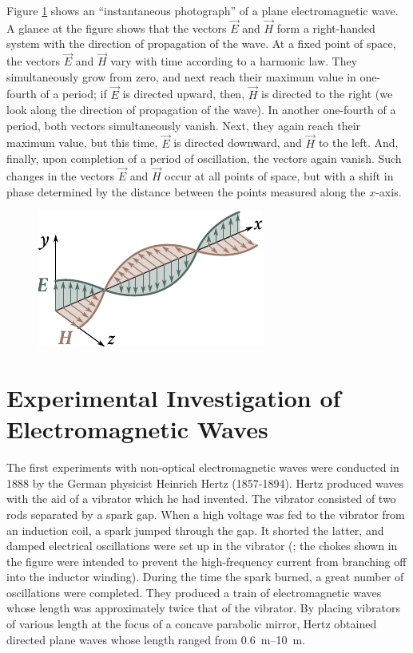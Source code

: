 Figure \ref{fig:15_1} shows an ``instantaneous photograph'' of a plane electromagnetic wave.
A glance at the figure shows that the vectors $\vec{E}$ and $\vec{H}$ form a right-handed system with the direction of propagation of the wave.
At a fixed point of space, the vectors $\vec{E}$ and $\vec{H}$ vary with time according to a harmonic law.
They simultaneously grow from zero, and next reach their maximum value in one-fourth of a period; if $\vec{E}$ is directed upward, then, $\vec{H}$ is directed to the right (we look along the direction of propagation of the wave).
In another one-fourth of a period, both vectors simultaneously vanish.
Next, they again reach their maximum value, but this time, $\vec{E}$ is directed downward, and $\vec{H}$ to the left.
And, finally, upon completion of a period of oscillation, the vectors again vanish.
Such changes in the vectors $\vec{E}$ and $\vec{H}$ occur at all points of space, but with a shift in phase determined by the distance between the points measured along the $x$-axis.

\begin{figure}[t]
	\begin{center}
		\includegraphics[scale=1]{figures/ch_15/fig_15_1.pdf}
		\caption[]{}
		\label{fig:15_1}
	\end{center}
	\vspace{-0.8cm}
\end{figure}

\section{Experimental Investigation of Electromagnetic Waves}\label{sec:15_3}

The first experiments with non-optical electromagnetic waves were conducted in 1888 by the German physicist Heinrich Hertz (1857-1894).
Hertz produced waves with the aid of a vibrator which he had invented.
The vibrator consisted of two rods separated by a spark gap.
When a high voltage was fed to the vibrator from an induction coil, a spark jumped through the gap.
It shorted the latter, and damped electrical oscillations were set up in the vibrator (; the chokes shown in the figure were intended to prevent the high-frequency current from branching off into the inductor winding).
During the time the spark burned, a great number of oscillations were completed.
They produced a train of electromagnetic waves whose length was approximately twice that of the vibrator.
By placing vibrators of various length at the focus of a concave parabolic mirror, Hertz obtained directed plane waves whose length ranged from \SIrange{0.6}{10}{\metre}.

